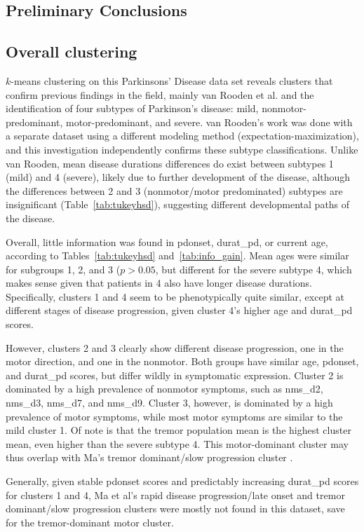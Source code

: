 \documentclass[10pt]{article}
\begin{document}
\begin{multicols}{2}
\section{Preliminary Conclusions}

\subsection{Overall clustering}
$k$-means clustering on this Parkinsons' Disease data set reveals clusters that confirm previous
findings in the field, mainly van Rooden et al. \cite{vanrooden10} and the identification of four
subtypes of Parkinson's disease: mild, nonmotor-predominant, motor-predominant, and severe.  van
Rooden's work was done with a separate dataset using a different modeling method
(expectation-maximization), and this investigation independently confirms these subtype
classifications. Unlike van Rooden, mean disease durations differences do exist between subtypes 1
(mild) and 4 (severe), likely due to further development of the disease, although the differences
between 2 and 3 (nonmotor/motor predominated) subtypes are insignificant
(Table~\ref{tab:tukeyhsd}), suggesting different developmental paths of the disease.

Overall, little information was found in pdonset,
durat\_pd, or current age, according to Tables~\ref{tab:tukeyhsd}
and~\ref{tab:info_gain}.  Mean ages were similar for subgroups 1, 2, and 3 ($p >
0.05$, but different for the severe subtype 4, which makes sense given that
patients in 4 also have longer disease durations. Specifically, clusters 1 and
4 seem to be phenotypically quite similar, except at different stages of
disease progression, given cluster 4's higher age and durat\_pd scores.

However, clusters 2 and 3 clearly show different disease progression, one in
the motor direction, and one in the nonmotor. Both groups have similar age,
pdonset, and durat\_pd scores, but differ wildly in symptomatic expression.
Cluster 2 is dominated by a high prevalence of nonmotor symptoms, such as
nms\_d2, nms\_d3, nms\_d7, and nms\_d9. Cluster 3, however, is dominated by a
high prevalence of motor symptoms, while most motor symptoms are similar to the
mild cluster 1. Of note is that the tremor population mean
is the highest cluster mean, even higher than the severe subtype 4. This
motor-dominant cluster may thus overlap with Ma's tremor dominant/slow
progression cluster \cite{ma15}.

Generally, given stable pdonset scores and predictably increasing durat\_pd
scores for clusters 1 and 4, Ma et al's rapid disease
progression/late onset and tremor dominant/slow progression clusters
\cite{ma15} were mostly not found in this dataset, save for the tremor-dominant
motor cluster.


\end{multicols}
\end{document}
